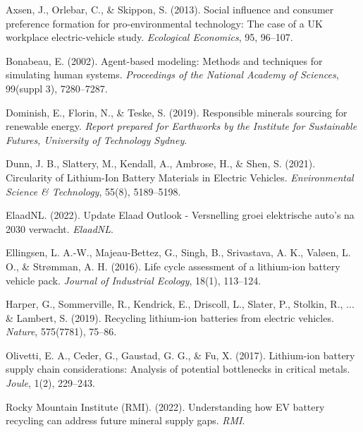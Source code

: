 \documentclass[10pt,a4paper,twocolumn]{article}
\begin{document}

\begin{thebibliography}{99}

Axsen, J., Orlebar, C., \& Skippon, S. (2013).
\newblock Social influence and consumer preference formation for pro-environmental technology: The case of a UK workplace electric-vehicle study.
\newblock \textit{Ecological Economics}, 95, 96--107.

Bonabeau, E. (2002).
\newblock Agent-based modeling: Methods and techniques for simulating human systems.
\newblock \textit{Proceedings of the National Academy of Sciences}, 99(suppl 3), 7280--7287.

Dominish, E., Florin, N., \& Teske, S. (2019).
\newblock Responsible minerals sourcing for renewable energy.
\newblock \textit{Report prepared for Earthworks by the Institute for Sustainable Futures, University of Technology Sydney}.

Dunn, J. B., Slattery, M., Kendall, A., Ambrose, H., \& Shen, S. (2021).
\newblock Circularity of Lithium-Ion Battery Materials in Electric Vehicles.
\newblock \textit{Environmental Science \& Technology}, 55(8), 5189--5198.

ElaadNL. (2022).
\newblock Update Elaad Outlook - Versnelling groei elektrische auto's na 2030 verwacht.
\newblock \textit{ElaadNL}.

Ellingsen, L. A.-W., Majeau-Bettez, G., Singh, B., Srivastava, A. K., Valøen, L. O., \& Strømman, A. H. (2016).
\newblock Life cycle assessment of a lithium-ion battery vehicle pack.
\newblock \textit{Journal of Industrial Ecology}, 18(1), 113--124.

Harper, G., Sommerville, R., Kendrick, E., Driscoll, L., Slater, P., Stolkin, R., ... \& Lambert, S. (2019).
\newblock Recycling lithium-ion batteries from electric vehicles.
\newblock \textit{Nature}, 575(7781), 75--86.

Olivetti, E. A., Ceder, G., Gaustad, G. G., \& Fu, X. (2017).
\newblock Lithium-ion battery supply chain considerations: Analysis of potential bottlenecks in critical metals.
\newblock \textit{Joule}, 1(2), 229--243.

Rocky Mountain Institute (RMI). (2022).
\newblock Understanding how EV battery recycling can address future mineral supply gaps.
\newblock \textit{RMI}.


\end{thebibliography}
\end{document}
